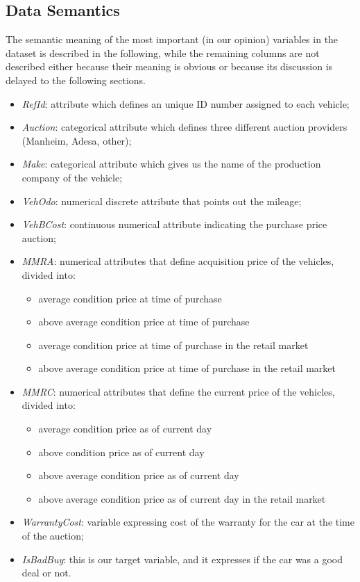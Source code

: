 \documentclass{article}
\begin{document}
	\subsection{Data Semantics}
	\label{sec:dataSemantics}
	The semantic meaning of the most important (in our opinion) variables in the dataset is described in the following, while the remaining columns are not described either because their meaning is obvious or because its discussion is delayed to the following sections.
	\begin{itemize}
		\item \emph{RefId}: attribute which defines an unique ID number assigned to each vehicle;
		\item \emph{Auction}: categorical attribute which defines three different auction providers (Manheim, Adesa, other);
		\item \emph{Make}: categorical attribute which gives us the name of the production company of the vehicle;
		\item \emph{VehOdo}: numerical discrete attribute that points out the mileage;
		\item \emph{VehBCost}: continuous numerical attribute indicating the purchase price auction;
		\item \emph{MMRA}: numerical attributes that define acquisition price of the vehicles, divided into:
		\begin{itemize}
			\item average condition price at time of purchase 
			\item above average condition price at time of purchase
			\item average condition price at time of purchase in the retail market
			\item above average condition price at time of purchase in the retail market 
		\end{itemize}
		\item \emph{MMRC}: numerical attributes that define the current price of the vehicles, divided into:
		\begin{itemize}
			\item average condition price as of current day 
			\item above condition price as of current day
			\item above average condition price as of current day
			\item above average condition  price as of current day in the retail market
		\end{itemize}
		\item \emph{WarrantyCost}: variable expressing cost of the warranty for the car at the time of the auction;
		\item \emph{IsBadBuy}: this is our target variable, and it expresses if the car was a good deal or not.
	\end{itemize}
	
\end{document}
